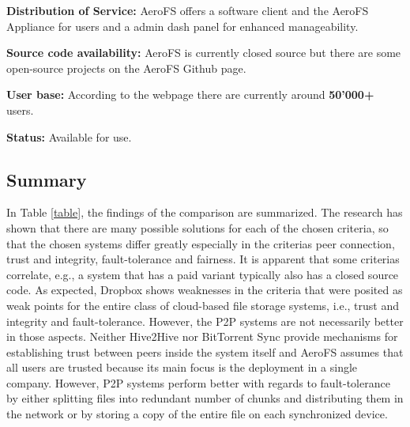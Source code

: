 \textbf{Distribution of Service:} AeroFS offers a software client and the AeroFS Appliance for users and a admin dash panel for enhanced manageability.

\textbf{Source code availability:} AeroFS is currently closed source but there are some open-source projects on the AeroFS Github page.

\textbf{User base:} According to the webpage \cite{aerofs} there are currently around \textbf{50'000\textsc{+}} users.

\textbf{Status:} Available for use.

\subsection{Summary}
\label{subsec:summary}
In Table \ref{table}, the findings of the comparison are summarized. The research has shown that there are many possible solutions for each of the chosen criteria, so that the chosen systems differ greatly especially in the criterias peer connection, trust and integrity, fault-tolerance and fairness. It is apparent that some criterias correlate, e.g., a system that has a paid variant typically also has a closed source code. As expected, Dropbox shows weaknesses in the criteria that were posited as weak points for the entire class of cloud-based file storage systems, i.e., trust and integrity and fault-tolerance. However, the P2P systems are not necessarily better in those aspects. Neither Hive2Hive nor BitTorrent Sync provide mechanisms for establishing trust between peers inside the system itself and AeroFS assumes that all users are trusted because its main focus is the deployment in a single company. However, P2P systems perform better with regards to fault-tolerance by either splitting files into redundant number of chunks and distributing them in the network or by storing a copy of the entire file on each synchronized device.

